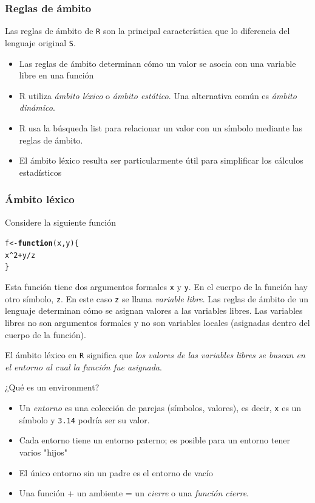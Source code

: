\documentclass{article}\usepackage[]{graphicx}\usepackage[]{color}
\makeatletter
\newcommand{\hlnum}[1]{\textcolor[rgb]{0.686,0.059,0.569}{#1}}%
\newcommand{\hlopt}[1]{\textcolor[rgb]{0,0,0}{#1}}%
\newcommand{\hlstd}[1]{\textcolor[rgb]{0.345,0.345,0.345}{#1}}%
\newcommand{\hlkwa}[1]{\textcolor[rgb]{0.161,0.373,0.58}{\textbf{#1}}}%
\newcommand{\hlkwb}[1]{\textcolor[rgb]{0.69,0.353,0.396}{#1}}%
\newcommand{\hlkwc}[1]{\textcolor[rgb]{0.333,0.667,0.333}{#1}}%
\newenvironment{kframe}{%
 \def\at@end@of@kframe{}%
 \ifinner\ifhmode%
  \def\at@end@of@kframe{\end{minipage}}%
  \begin{minipage}{\columnwidth}%
 \fi\fi%
 \def\FrameCommand##1{\hskip\@totalleftmargin \hskip-\fboxsep
 \colorbox{shadecolor}{##1}\hskip-\fboxsep
     \hskip-\linewidth \hskip-\@totalleftmargin \hskip\columnwidth}%
 \MakeFramed {\advance\hsize-\width
   \@totalleftmargin\z@ \linewidth\hsize
   \@setminipage}}%
 {\par\unskip\endMakeFramed%
 \at@end@of@kframe}
\newenvironment{knitrout}{}{} %
\makeatother
\begin{document}
    \subsubsection{Reglas de ámbito}
    Las reglas de ámbito de \texttt{R} son la principal característica que lo diferencia del lenguaje original \texttt{S}.
    \begin{itemize}
      \item Las reglas de ámbito determinan cómo un valor se asocia con una variable libre en una función
      \item R utiliza \emph{ámbito léxico} o \emph{ámbito estático}. Una alternativa común es \emph{ámbito dinámico}.
      \item R usa la búsqueda list para relacionar un valor con un símbolo mediante las reglas de ámbito.
      \item El ámbito léxico resulta ser particularmente útil para simplificar los cálculos estadísticos 
    \end{itemize}
    
    \subsubsection{Ámbito léxico}
    Considere la siguiente función
\begin{knitrout}
\color{fgcolor}\begin{kframe}
\begin{alltt}
  \hlstd{f} \hlkwb{<-} \hlkwa{function}\hlstd{(}\hlkwc{x}\hlstd{,} \hlkwc{y}\hlstd{)\{}
    \hlstd{x}\hlopt{^}\hlnum{2} \hlopt{+} \hlstd{y} \hlopt{/} \hlstd{z}
  \hlstd{\}}
\end{alltt}
\end{kframe}
\end{knitrout}
    Esta función tiene dos argumentos formales \texttt{x} y \texttt{y}. En el cuerpo de la función hay otro símbolo, \texttt{z}. En este caso \texttt{z} se llama \emph{variable libre}. Las reglas de ámbito de un lenguaje determinan cómo se asignan valores a las variables libres. Las variables libres no son argumentos formales y no son variables locales (asignadas dentro del cuerpo de la función).\par
    El ámbito léxico en \texttt{R} significa que \emph{los valores de las variables libres se buscan en el entorno al cual la función fue asignada}.\\ \par
    ¿Qué es un environment?
    \begin{itemize}
      \item Un \emph{entorno} es una colección de parejas (símbolos, valores), es decir, \texttt{x} es un símbolo y \texttt{3.14} podría ser su valor.
      \item Cada entorno tiene un entorno paterno; es posible para un entorno tener varios "hijos"
      \item El único entorno sin un padre es el entorno de vacío
      \item Una función + un ambiente = un \emph{cierre} o una \emph{función cierre}.
    \end{itemize}
    
\end{document}
